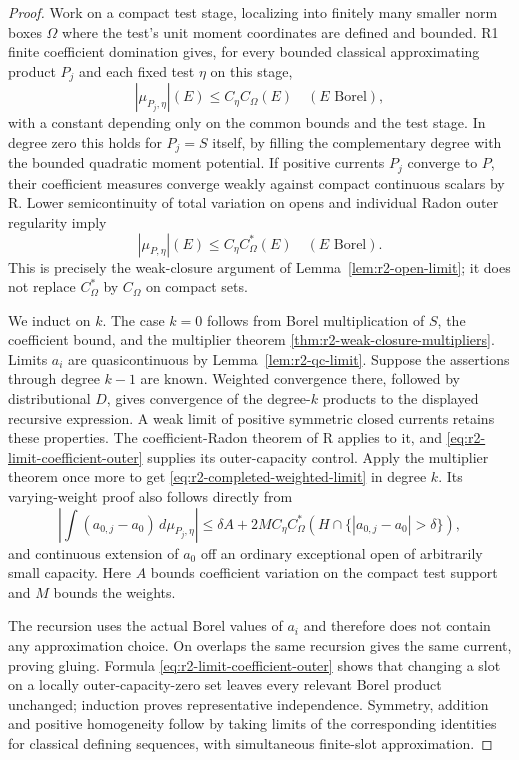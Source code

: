 \documentclass[11pt,a4paper]{article}
\numberwithin{equation}{section}
\theoremstyle{definition}
\theoremstyle{remark}
\begin{document}
\begin{proof}
Work on a compact test stage, localizing into finitely many smaller
norm boxes $\Omega$ where the test's unit moment coordinates are
defined and bounded. R1 finite coefficient domination gives, for
every bounded classical approximating product $P_j$ and each fixed
test $\eta$ on this stage,
\begin{equation}
\label{eq:r2-approx-coefficient-cap}
 |\mu_{P_j,\eta}|(E)\leq C_\eta C_\Omega(E)
       \quad(E\text{ Borel}),
\end{equation}
with a constant depending only on the common bounds and the test
stage. In degree zero this holds for $P_j=S$ itself, by filling
the complementary degree with the bounded quadratic moment
potential. If positive currents $P_j$ converge to $P$, their
coefficient measures converge weakly against compact continuous
scalars by \textup{R}. Lower semicontinuity of total variation on
opens and individual Radon outer regularity imply
\begin{equation}
\label{eq:r2-limit-coefficient-outer}
 |\mu_{P,\eta}|(E)\leq C_\eta C_\Omega^*(E)
       \quad(E\text{ Borel}).
\end{equation}
This is precisely the weak-closure argument of
Lemma~\ref{lem:r2-open-limit}; it does not replace $C_\Omega^*$
by $C_\Omega$ on compact sets.

We induct on $k$. The case $k=0$ follows from Borel multiplication
of $S$, the coefficient bound, and the multiplier theorem
\ref{thm:r2-weak-closure-multipliers}. Limits $a_i$ are
quasicontinuous by Lemma~\ref{lem:r2-qc-limit}. Suppose the
assertions through degree $k-1$ are known. Weighted convergence
there, followed by distributional $D$, gives convergence of the
degree-$k$ products to the displayed recursive expression. A weak
limit of positive symmetric closed currents retains these
properties. The coefficient-Radon theorem of \textup{R} applies
to it, and \eqref{eq:r2-limit-coefficient-outer} supplies its
outer-capacity control. Apply the multiplier theorem once more
to get \eqref{eq:r2-completed-weighted-limit} in degree $k$.
Its varying-weight proof also follows directly from
\[
 \left|\int(a_{0,j}-a_0)\,d\mu_{P_j,\eta}\right|
 \leq\delta A+2M C_\eta
      C_\Omega^*(H\cap\{|a_{0,j}-a_0|>\delta\}),
\]
and continuous extension of $a_0$ off an ordinary exceptional
open of arbitrarily small capacity. Here $A$ bounds coefficient
variation on the compact test support and $M$ bounds the weights.

The recursion uses the actual Borel values of $a_i$ and therefore
does not contain any approximation choice. On overlaps the same
recursion gives the same current, proving gluing. Formula
\eqref{eq:r2-limit-coefficient-outer} shows that changing a slot
on a locally outer-capacity-zero set leaves every relevant Borel
product unchanged; induction proves representative independence.
Symmetry, addition and positive homogeneity follow by taking
limits of the corresponding identities for classical defining
sequences, with simultaneous finite-slot approximation.


\end{proof}
\end{document}
